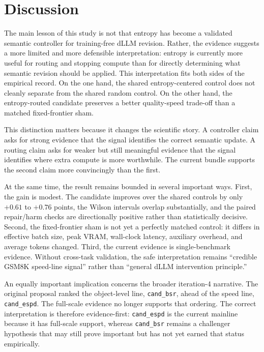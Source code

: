 \documentclass{article}
\begin{document}
\section{Discussion}

The main lesson of this study is not that entropy has become a validated semantic controller for training-free dLLM revision. Rather, the evidence suggests a more limited and more defensible interpretation: entropy is currently more useful for routing and stopping compute than for directly determining what semantic revision should be applied. This interpretation fits both sides of the empirical record. On the one hand, the shared entropy-centered control does not cleanly separate from the shared random control. On the other hand, the entropy-routed candidate preserves a better quality-speed trade-off than a matched fixed-frontier sham.

This distinction matters because it changes the scientific story. A controller claim asks for strong evidence that the signal identifies the correct semantic update. A routing claim asks for weaker but still meaningful evidence that the signal identifies where extra compute is more worthwhile. The current bundle supports the second claim more convincingly than the first.

At the same time, the result remains bounded in several important ways. First, the gain is modest. The candidate improves over the shared controls by only $+0.61$ to $+0.76$ points, the Wilson intervals overlap substantially, and the paired repair/harm checks are directionally positive rather than statistically decisive. Second, the fixed-frontier sham is not yet a perfectly matched control: it differs in effective batch size, peak VRAM, wall-clock latency, auxiliary overhead, and average tokens changed. Third, the current evidence is single-benchmark evidence. Without cross-task validation, the safe interpretation remains ``credible GSM8K speed-line signal'' rather than ``general dLLM intervention principle.''

An equally important implication concerns the broader iteration-4 narrative. The original proposal ranked the object-level line, \texttt{cand\_bsr}, ahead of the speed line, \texttt{cand\_espd}. The full-scale evidence no longer supports that ordering. The correct interpretation is therefore evidence-first: \texttt{cand\_espd} is the current mainline because it has full-scale support, whereas \texttt{cand\_bsr} remains a challenger hypothesis that may still prove important but has not yet earned that status empirically.
\end{document}
